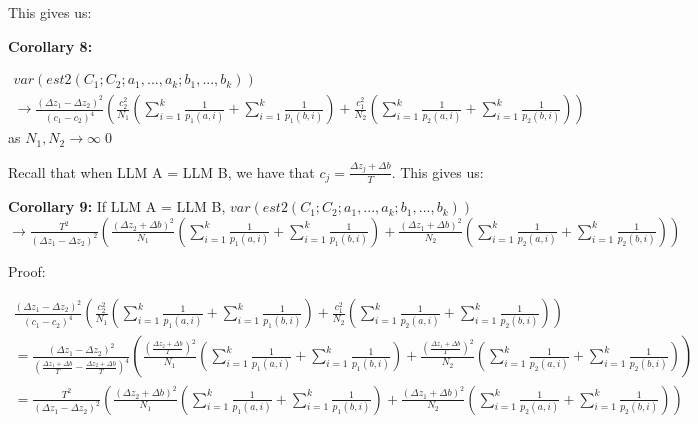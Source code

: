 \documentclass{article}
\begin{document}
This gives us:



\textbf{Corollary 8: }

$\displaystyle  \begin{array}{l}
var( est2( C_{1} ;C_{2} ;a_{1} ,...,a_{k} ;b_{1} ,...,b_{k}))\\
\rightarrow \frac{( \Delta z_{1} -\Delta z_{2})^{2}}{( c_{1} -c_{2})^{4}}\left(\frac{c_{2}^{2}}{N_{1}}\left(\sum _{i=1}^{k}\frac{1}{p_{1}( a,i)} +\sum _{i=1}^{k}\frac{1}{p_{1}( b,i)}\right) +\frac{c_{1}^{2}}{N_{2}}\left(\sum _{i=1}^{k}\frac{1}{p_{2}( a,i)} +\sum _{i=1}^{k}\frac{1}{p_{2}( b,i)}\right)\right)
\end{array}$ as $\displaystyle N_{1} ,N_{2}\rightarrow \infty $\qed 



Recall that when LLM A = LLM B, we have that $\displaystyle c_{j} =\frac{\Delta z_{j} +\Delta b}{T}$. This gives us:



\textbf{Corollary 9:} If LLM A = LLM B, $\displaystyle
var\left( est2\left( C_{1} ;C_{2} ;a_{1} ,...,a_{k} ;b_{1} ,...,b_{k}\right)\right)$\\
$\rightarrow \frac{T^{2}}{\left( \Delta z_{1} -\Delta z_{2}\right)^{2}}\left(\frac{\left( \Delta z_{2} +\Delta b\right)^{2}}{N_{1}}\left(\sum _{i=1}^{k}\frac{1}{p_{1}\left( a,i\right)} +\sum _{i=1}^{k}\frac{1}{p_{1}\left( b,i\right)}\right) +\frac{\left( \Delta z_{1} +\Delta b\right)^{2}}{N_{2}}\left(\sum _{i=1}^{k}\frac{1}{p_{2}\left( a,i\right)} +\sum _{i=1}^{k}\frac{1}{p_{2}\left( b,i\right)}\right)\right)$



Proof:

$\displaystyle  \begin{array}{l}
\frac{\left( \Delta z_{1} -\Delta z_{2}\right)^{2}}{\left( c_{1} -c_{2}\right)^{4}}\left(\frac{c_{2}^{2}}{N_{1}}\left(\sum _{i=1}^{k}\frac{1}{p_{1}\left( a,i\right)} +\sum _{i=1}^{k}\frac{1}{p_{1}\left( b,i\right)}\right) +\frac{c_{1}^{2}}{N_{2}}\left(\sum _{i=1}^{k}\frac{1}{p_{2}\left( a,i\right)} +\sum _{i=1}^{k}\frac{1}{p_{2}\left( b,i\right)}\right)\right)\\
=\frac{\left( \Delta z_{1} -\Delta z_{2}\right)^{2}}{\left(\frac{\Delta z_{1} +\Delta b}{T} -\frac{\Delta z_{2} +\Delta b}{T}\right)^{4}}\left(\frac{\left(\frac{\Delta z_{2} +\Delta b}{T}\right)^{2}}{N_{1}}\left(\sum _{i=1}^{k}\frac{1}{p_{1}\left( a,i\right)} +\sum _{i=1}^{k}\frac{1}{p_{1}\left( b,i\right)}\right) +\frac{\left(\frac{\Delta z_{1} +\Delta b}{T}\right)^{2}}{N_{2}}\left(\sum _{i=1}^{k}\frac{1}{p_{2}\left( a,i\right)} +\sum _{i=1}^{k}\frac{1}{p_{2}\left( b,i\right)}\right)\right)\\
=\frac{T^{2}}{\left( \Delta z_{1} -\Delta z_{2}\right)^{2}}\left(\frac{\left( \Delta z_{2} +\Delta b\right)^{2}}{N_{1}}\left(\sum _{i=1}^{k}\frac{1}{p_{1}\left( a,i\right)} +\sum _{i=1}^{k}\frac{1}{p_{1}\left( b,i\right)}\right) +\frac{\left( \Delta z_{1} +\Delta b\right)^{2}}{N_{2}}\left(\sum _{i=1}^{k}\frac{1}{p_{2}\left( a,i\right)} +\sum _{i=1}^{k}\frac{1}{p_{2}\left( b,i\right)}\right)\right)
\end{array}$
\end{document}
